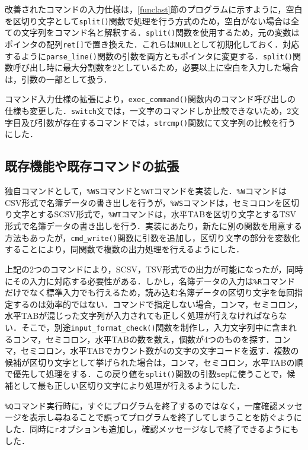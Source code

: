 改善されたコマンドの入力仕様は，\ref{funclast}節のプログラムに示すように，空白を区切り文字として\verb|split()|関数で処理を行う方式のため，空白がない場合は全ての文字列をコマンド名と解釈する．\verb|split()|関数を使用するため，元の変数はポインタの配列\verb|ret[]|で置き換えた．これらは\verb|NULL|として初期化しておく．対応するように\verb|parse_line()|関数の引数を両方ともポインタに変更する．\verb|split()|関数呼び出し時に最大分割数を2としているため，必要以上に空白を入力した場合は，引数の一部として扱う．

コマンド入力仕様の拡張により，\verb|exec_command()|関数内のコマンド呼び出しの仕様も変更した．\verb|switch|文では，一文字のコマンドしか比較できないため，2文字目及び引数が存在するコマンドでは，\verb|strcmp()|関数にて文字列の比較を行うにした．


\subsection{既存機能や既存コマンドの拡張} \label{advancedcommand}
独自コマンドとして，\verb|%WS|コマンドと\verb|%WT|コマンドを実装した．\verb|%W|コマンドはCSV形式で名簿データの書き出しを行うが，\verb|%WS|コマンドは，セミコロンを区切り文字とするSCSV形式で，\verb|%WT|コマンドは，水平TABを区切り文字とするTSV形式で名簿データの書き出しを行う．実装にあたり，新たに別の関数を用意する方法もあったが，\verb|cmd_write()|関数に引数を追加し，区切り文字の部分を変数化することにより，同関数で複数の出力処理を行えるようにした．

上記の2つのコマンドにより，SCSV，TSV形式での出力が可能になったが，同時にその入力に対応する必要性がある．しかし，名簿データの入力は\verb|%R|コマンドだけでなく標準入力でも行えるため，読み込む名簿データの区切り文字を毎回指定するのは効率的ではない．コマンドで指定しない場合，コンマ，セミコロン，水平TABが混じった文字列が入力されても正しく処理が行えなければならない．そこで，別途\verb|input_format_check()|関数を制作し，入力文字列中に含まれるコンマ，セミコロン，水平TABの数を数え，個数が4つのものを探す．コンマ，セミコロン，水平TABでカウント数が4の文字の文字コードを返す．複数の候補が区切り文字として挙げられた場合は，コンマ，セミコロン，水平TABの順で優先して処理をする．この戻り値を\verb|split()|関数の引数\verb|sep|に使うことで，候補として最も正しい区切り文字により処理が行えるようにした．

\verb|%Q|コマンド実行時に，すぐにプログラムを終了するのではなく，一度確認メッセージを表示し尋ねることで誤ってプログラムを終了してしまうことを防ぐようにした．同時に\verb|r|オプションも追加し，確認メッセージなしで終了できるようにもした．

